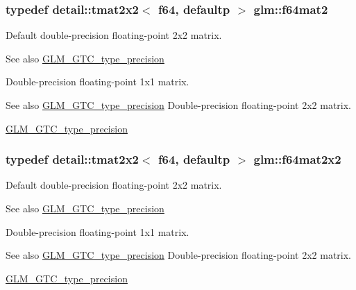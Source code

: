 \subsubsection[{\texorpdfstring{f64mat2}{f64mat2}}]{\setlength{\rightskip}{0pt plus 5cm}typedef detail\+::tmat2x2$<$ f64, defaultp $>$ {\bf glm\+::f64mat2}}\hypertarget{group__gtc__type__precision_gaa66040c1fd82a9d1f6ac82d4e1e8baa6}{}\label{group__gtc__type__precision_gaa66040c1fd82a9d1f6ac82d4e1e8baa6}
Default double-\/precision floating-\/point 2x2 matrix. \begin{DoxySeeAlso}{See also}
\hyperlink{group__gtc__type__precision}{G\+L\+M\+\_\+\+G\+T\+C\+\_\+type\+\_\+precision}
\end{DoxySeeAlso}
Double-\/precision floating-\/point 1x1 matrix. \begin{DoxySeeAlso}{See also}
\hyperlink{group__gtc__type__precision}{G\+L\+M\+\_\+\+G\+T\+C\+\_\+type\+\_\+precision} Double-\/precision floating-\/point 2x2 matrix. 

\hyperlink{group__gtc__type__precision}{G\+L\+M\+\_\+\+G\+T\+C\+\_\+type\+\_\+precision} 
\end{DoxySeeAlso}
\subsubsection[{\texorpdfstring{f64mat2x2}{f64mat2x2}}]{\setlength{\rightskip}{0pt plus 5cm}typedef detail\+::tmat2x2$<$ f64, defaultp $>$ {\bf glm\+::f64mat2x2}}\hypertarget{group__gtc__type__precision_gad125d405392e76f26f359798350fb64f}{}\label{group__gtc__type__precision_gad125d405392e76f26f359798350fb64f}
Default double-\/precision floating-\/point 2x2 matrix. \begin{DoxySeeAlso}{See also}
\hyperlink{group__gtc__type__precision}{G\+L\+M\+\_\+\+G\+T\+C\+\_\+type\+\_\+precision}
\end{DoxySeeAlso}
Double-\/precision floating-\/point 1x1 matrix. \begin{DoxySeeAlso}{See also}
\hyperlink{group__gtc__type__precision}{G\+L\+M\+\_\+\+G\+T\+C\+\_\+type\+\_\+precision} Double-\/precision floating-\/point 2x2 matrix. 

\hyperlink{group__gtc__type__precision}{G\+L\+M\+\_\+\+G\+T\+C\+\_\+type\+\_\+precision} 
\end{DoxySeeAlso}
